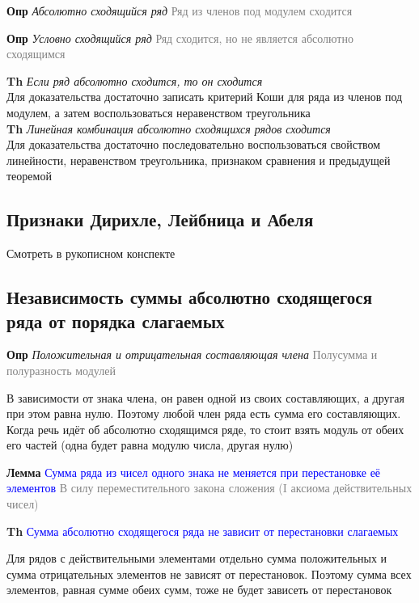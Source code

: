 \textbf{Опр} \textit{Абсолютно сходящийся ряд} \textcolor{gray}{Ряд из членов под модулем сходится}

\textbf{Опр} \textit{Условно сходящийся ряд} \textcolor{gray}{Ряд сходится, но не является абсолютно сходящимся}

\textbf{Th} \textit{Если ряд абсолютно сходится, то он сходится} \\

Для доказательства достаточно записать критерий Коши для ряда из членов под модулем, а затем воспользоваться
неравенством треугольника \\

\textbf{Th} \textit{Линейная комбинация абсолютно сходящихся рядов сходится} \\

Для доказательства достаточно последовательно воспользоваться свойством линейности, неравенством треугольника,
признаком сравнения и предыдущей теоремой

\subsection{Признаки Дирихле, Лейбница и Абеля}

Смотреть в рукописном конспекте

\subsection{Независимость суммы абсолютно сходящегося ряда от порядка слагаемых}

\textbf{Опр} \textit{Положительная и отрицательная составляющая члена} \textcolor{gray}{Полусумма и полуразность
модулей}

В зависимости от знака члена, он равен одной из своих составляющих, а другая при этом равна нулю.
Поэтому любой член ряда есть сумма его составляющих.
Когда речь идёт об абсолютно сходящимся ряде, то стоит взять модуль от обеих его частей (одна будет равна модулю
числа, другая нулю)

\textbf{Лемма} \textcolor{blue}{Сумма ряда из чисел одного знака не меняется при перестановке её элементов} \textcolor{gray}{В
силу переместительного закона сложения (I аксиома действительных чисел)}

\textbf{Th} \textcolor{blue}{Сумма абсолютно сходящегося ряда не зависит от перестановки слагаемых}

Для рядов с действительными элементами отдельно сумма положительных и сумма отрицательных элементов не
зависят от перестановок.
Поэтому сумма всех элементов, равная сумме обеих сумм, тоже не будет зависеть от перестановок

